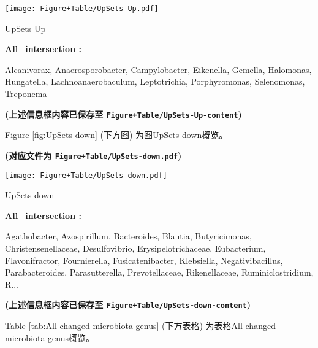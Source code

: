 \documentclass[
]{article}
\begin{document}
\def\@captype{figure}
\begin{center}
\texttt{[image: Figure+Table/UpSets-Up.pdf]}
\caption{UpSets Up}\label{fig:UpSets-Up}
\end{center}
\begin{center}\begin{tcolorbox}[colback=gray!10, colframe=gray!50, width=0.9\linewidth, arc=1mm, boxrule=0.5pt]
\textbf{
All\_intersection
:}

\vspace{0.5em}

    Alcanivorax, Anaerosporobacter, Campylobacter,
Eikenella, Gemella, Halomonas, Hungatella,
Lachnoanaerobaculum, Leptotrichia, Porphyromonas,
Selenomonas, Treponema

\vspace{2em}
\end{tcolorbox}
\end{center}

\textbf{(上述信息框内容已保存至 \texttt{Figure+Table/UpSets-Up-content})}

Figure \ref{fig:UpSets-down} (下方图) 为图UpSets down概览。

\textbf{(对应文件为 \texttt{Figure+Table/UpSets-down.pdf})}

\def\@captype{figure}
\begin{center}
\texttt{[image: Figure+Table/UpSets-down.pdf]}
\caption{UpSets down}\label{fig:UpSets-down}
\end{center}
\begin{center}\begin{tcolorbox}[colback=gray!10, colframe=gray!50, width=0.9\linewidth, arc=1mm, boxrule=0.5pt]
\textbf{
All\_intersection
:}

\vspace{0.5em}

    Agathobacter, Azospirillum, Bacteroides, Blautia,
Butyricimonas, Christensenellaceae, Desulfovibrio,
Erysipelotrichaceae, Eubacterium, Flavonifractor,
Fournierella, Fusicatenibacter, Klebsiella,
Negativibacillus, Parabacteroides, Parasutterella,
Prevotellaceae, Rikenellaceae, Ruminiclostridium, R...

\vspace{2em}
\end{tcolorbox}
\end{center}

\textbf{(上述信息框内容已保存至 \texttt{Figure+Table/UpSets-down-content})}

Table \ref{tab:All-changed-microbiota-genus} (下方表格) 为表格All changed microbiota genus概览。
\end{document}
